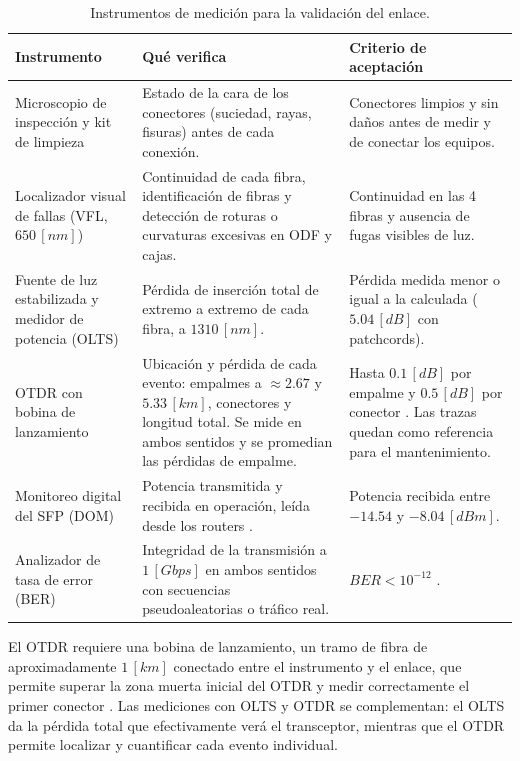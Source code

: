 \begin{table}[H]
    \centering
    \footnotesize
    \caption{Instrumentos de medición para la validación del enlace.}
    \label{tab:instrumentos}
    \begin{tabular}{|>{\raggedright\arraybackslash}m{3.2cm}|>{\raggedright\arraybackslash}m{5.6cm}|>{\raggedright\arraybackslash}m{5.2cm}|}
        \hline
        \textbf{Instrumento} & \textbf{Qué verifica} & \textbf{Criterio de aceptación} \\
        \hline
        Microscopio de inspección y kit de limpieza & Estado de la cara de los conectores (suciedad, rayas, fisuras) antes de cada conexión. & Conectores limpios y sin daños antes de medir y de conectar los equipos. \\
        \hline
        Localizador visual de fallas (VFL, $650 \, [nm]$) & Continuidad de cada fibra, identificación de fibras y detección de roturas o curvaturas excesivas en ODF y cajas. & Continuidad en las 4 fibras y ausencia de fugas visibles de luz. \\
        \hline
        Fuente de luz estabilizada y medidor de potencia (OLTS) & Pérdida de inserción total de extremo a extremo de cada fibra, a $1310 \, [nm]$. & Pérdida medida menor o igual a la calculada ($5.04 \, [dB]$ con patchcords). \\
        \hline
        OTDR con bobina de lanzamiento & Ubicación y pérdida de cada evento: empalmes a $\approx 2.67$ y $5.33 \, [km]$, conectores y longitud total. Se mide en ambos sentidos y se promedian las pérdidas de empalme. & Hasta $0.1 \, [dB]$ por empalme y $0.5 \, [dB]$ por conector \cite{b7}. Las trazas quedan como referencia para el mantenimiento. \\
        \hline
        Monitoreo digital del SFP (DOM) & Potencia transmitida y recibida en operación, leída desde los routers \cite{b18}. & Potencia recibida entre $-14.54$ y $-8.04 \, [dBm]$. \\
        \hline
        Analizador de tasa de error (BER) & Integridad de la transmisión a $1 \, [Gbps]$ en ambos sentidos con secuencias pseudoaleatorias o tráfico real. & $BER < 10^{-12}$ \cite{b7}. \\
        \hline
    \end{tabular}
\end{table}

El OTDR requiere una bobina de lanzamiento, un tramo de fibra de aproximadamente $1 \, [km]$ conectado entre el instrumento y el enlace, que permite superar la zona muerta inicial del OTDR y medir correctamente el primer conector \cite{b7, b17}. Las mediciones con OLTS y OTDR se complementan: el OLTS da la pérdida total que efectivamente verá el transceptor, mientras que el OTDR permite localizar y cuantificar cada evento individual.
